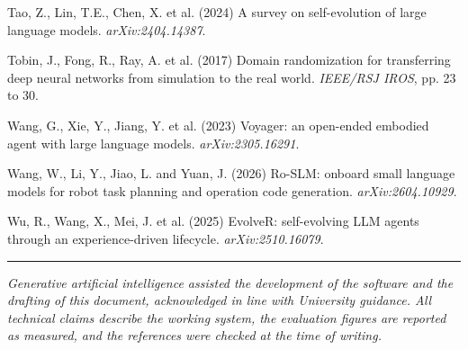 \documentclass[10.5pt]{article}
\begin{document}
{Tao, Z., Lin, T.E., Chen, X. et al. (2024) A survey on self-evolution of large language models. \textit{arXiv:2404.14387}.\par
Tobin, J., Fong, R., Ray, A. et al. (2017) Domain randomization for transferring deep neural networks from simulation to the real world. \textit{IEEE/RSJ IROS}, pp. 23 to 30.\par
Wang, G., Xie, Y., Jiang, Y. et al. (2023) Voyager: an open-ended embodied agent with large language models. \textit{arXiv:2305.16291}.\par
Wang, W., Li, Y., Jiao, L. and Yuan, J. (2026) Ro-SLM: onboard small language models for robot task planning and operation code generation. \textit{arXiv:2604.10929}.\par
Wu, R., Wang, X., Mei, J. et al. (2025) EvolveR: self-evolving LLM agents through an experience-driven lifecycle. \textit{arXiv:2510.16079}.\par
}

\vspace{4pt}\hrule\vspace{2pt}
{\footnotesize\itshape Generative artificial intelligence assisted the development of the software and the drafting of this document, acknowledged in line with University guidance. All technical claims describe the working system, the evaluation figures are reported as measured, and the references were checked at the time of writing.}
\end{document}
